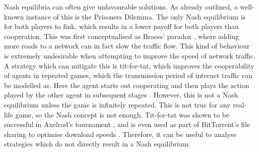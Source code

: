 \documentclass{article}
\begin{document}
\begin{multicols}{2}
Nash equilibria can often give unfavourable solutions. As already outlined, a well-known instance of this is the Prisoners Dilemma. The only Nash equilibrium is for both players to fink, which results in a lower payoff for both players than cooperation. This was first conceptualised as Braess’ paradox \cite{braess_paradox_2005}, where adding more roads to a network can in fact slow the traffic flow. This kind of behaviour is extremely undesirable when attempting to improve the speed of network traffic. A strategy which can mitigate this is tit-for-tat, which improves the cooperability of agents in repeated games, which the transmission period of internet traffic can be modelled as. Here the agent starts out cooperating and then plays the action played by the other agent in subsequent stages \cite{beyond_nash}. However, this is not a Nash equilibrium unless the game is infinitely repeated. This is not true for any real-life game, so the Nash concept is not enough. Tit-for-tat was shown to be successful in Axelrod’s tournament \cite{alexrod}, and is even used as part of BitTorrent’s file sharing to optimise download speeds \cite{cohen_incentives_2003}. Therefore, it can be useful to analyse strategies which do not directly result in a Nash equilibrium.



\printbibliography
\end{multicols}
\end{document}
